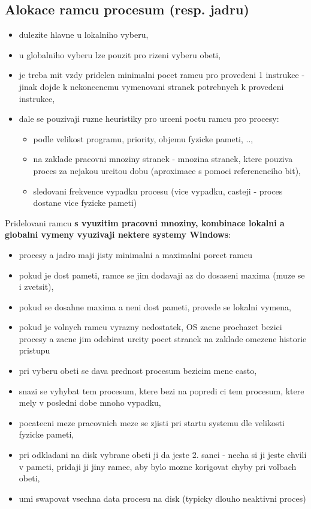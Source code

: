 \documentclass[a4paper, 11pt]{article}
\begin{document}
\subsection{Alokace ramcu procesum (resp. jadru)}
\begin{itemize}
    \item dulezite hlavne u lokalniho vyberu,
    \item u globalniho vyberu lze pouzit pro rizeni vyberu obeti,
    \item je treba mit vzdy pridelen minimalni pocet ramcu pro provedeni 1 instrukce - jinak dojde k nekonecnemu vymenovani stranek potrebnych k provedeni instrukce,
    \item dale se pouzivaji ruzne heuristiky pro urceni poctu ramcu pro procesy:
    \begin{itemize}
        \item podle velikost programu, priority, objemu fyzicke pameti, ..,
        \item na zaklade pracovni mnoziny stranek - mnozina stranek, ktere pouziva proces za nejakou urcitou dobu (aproximace s pomoci referencnciho bit),
        \item sledovani frekvence vypadku procesu (vice vypadku, casteji - proces dostane vice fyzicke pameti) \\
    \end{itemize}
\end{itemize}

Pridelovani ramcu \textbf{s vyuzitim pracovni mnoziny, kombinace lokalni a globalni vymeny vyuzivaji nektere systemy Windows}:
\begin{itemize}
    \item procesy a jadro maji jisty minimalni a maximalni porcet ramcu
    \item pokud je dost pameti, ramce se jim dodavaji az do dosaseni maxima (muze se i zvetsit),
    \item pokud se dosahne maxima a neni dost pameti, provede se lokalni vymena,
    \item pokud je volnych ramcu vyrazny nedostatek, OS zacne prochazet bezici procesy a zacne jim odebirat urcity pocet stranek na zaklade omezene historie pristupu
    \item pri vyberu obeti se dava prednost procesum bezicim mene casto,
    \item snazi se vyhybat tem procesum, ktere bezi na popredi ci tem procesum, ktere mely v posledni dobe mnoho vypadku,
    \item pocatecni meze pracovnich meze se zjisti pri startu systemu dle velikosti fyzicke pameti,
    \item pri odkladani na disk vybrane obeti ji da jeste 2. sanci - necha si ji jeste chvili v pameti, pridaji ji jiny ramec, aby bylo mozne korigovat chyby pri volbach obeti,
    \item umi swapovat vsechna data procesu na disk (typicky dlouho neaktivni proces) \\
\end{itemize}
\end{document}

